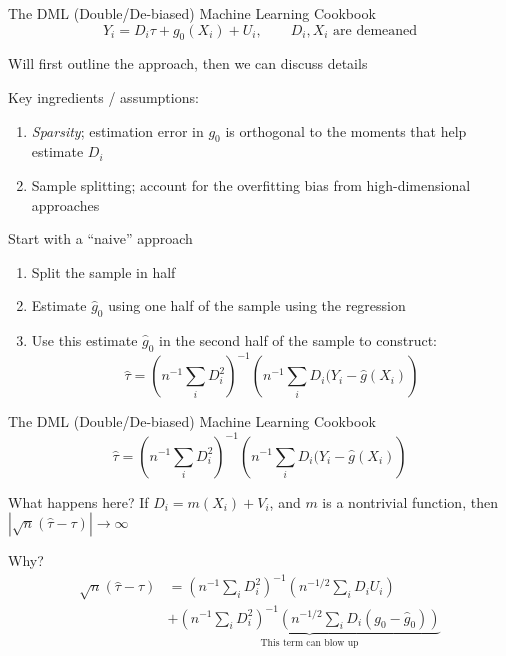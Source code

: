 \documentclass[notes,11pt, aspectratio=169]{beamer}
\newenvironment{wideitemize}{\itemize\addtolength{\itemsep}{10pt}}{\enditemize}
\begin{document}
\begin{frame}{The DML (Double/De-biased) Machine Learning Cookbook}
  $$Y_{i} = D_{i}\tau + g_{0}(X_{i}) + U_{i}, \qquad D_{i}, X_{i} \text{ are demeaned}$$  
  \begin{wideitemize}
  \item Will first outline the approach, then we can discuss details
  \item Key ingredients / assumptions:
    \begin{enumerate}
    \item \emph{Sparsity}; estimation error in $g_{0}$ is orthogonal
      to the moments that help estimate $D_{i}$
    \item Sample splitting; account for the overfitting bias from
      high-dimensional approaches
    \end{enumerate}
  \item Start with a ``naive'' approach
    \begin{enumerate}
    \item Split the sample in half
    \item Estimate $\hat{g}_{0}$ using one half of the sample using the regression
    \item Use this estimate $\hat{g}_{0}$ in the second half of the sample to construct:
      $$\hat{\tau} = \left(n^{-1}\sum_{i}D^{2}_{i}\right)^{-1}\left(n^{-1}\sum_{i}D_{i}(Y_{i} - \hat{g}(X_{i})\right)$$      
    \end{enumerate}
  \end{wideitemize}
\end{frame}

\begin{frame}{The DML (Double/De-biased) Machine Learning Cookbook}
  $$\hat{\tau} = \left(n^{-1}\sum_{i}D^{2}_{i}\right)^{-1}\left(n^{-1}\sum_{i}D_{i}(Y_{i} - \hat{g}(X_{i})\right)$$
  \begin{wideitemize}
  \item What happens here? If $D_{i} = m(X_{i}) + V_{i}$, and $m$ is a
    nontrivial function, then $|\sqrt{n}(\hat{\tau} - \tau)| \rightarrow \infty$
  \item Why?
    \begin{align*}
      \sqrt{n}(\hat{\tau} - \tau) &= \left(n^{-1}\sum_{i}D^{2}_{i}\right)^{-1}\left(n^{-1/2}\sum_{i}D_{i}U_{i}\right) \\
      &+ \underbrace{\left(n^{-1}\sum_{i}D^{2}_{i}\right)^{-1}\left(n^{-1/2}\sum_{i}D_{i}(g_{0} - \hat{g}_{0})\right)}_{\text{This term can blow up}}
      \end{align*}
  \end{wideitemize}
\end{frame}
\end{document}
